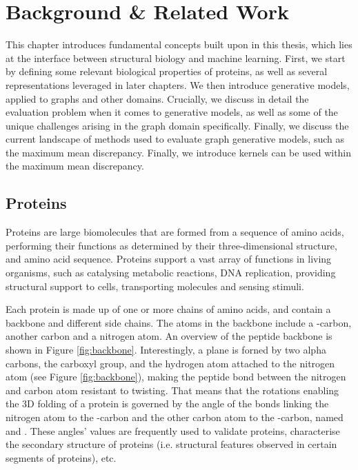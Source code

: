 
\chapter{Background \& Related Work}


This chapter introduces fundamental concepts built upon in this thesis, which
lies at the interface between structural biology and machine learning. First, we
start by defining some relevant biological properties of proteins, as well as
several representations leveraged in later chapters. We then introduce
generative models, applied to graphs and other domains. Crucially, we discuss in
detail the evaluation problem when it comes to generative models, as well as
some of the unique challenges arising in the graph domain specifically. Finally,
we discuss the current landscape of methods used to evaluate
graph generative models, such as the maximum mean discrepancy. Finally, we
introduce kernels can be used within the maximum mean discrepancy.

\section{Proteins}\label{sec:proteins}

Proteins are large biomolecules that are formed from a sequence of amino acids,
performing their functions as determined by their three-dimensional structure,
and amino acid sequence. Proteins support a vast array of functions in living
organisms, such as catalysing metabolic reactions, DNA replication, providing
structural support to cells, transporting molecules and sensing stimuli.

Each protein is made up of one or more chains of amino acids, and contain a
backbone and different side chains. The atoms in the backbone include a
\textalpha{}-carbon, another carbon and a nitrogen atom. An overview of the
peptide backbone is shown in Figure \ref{fig:backbone}. Interestingly, a plane
is forned by two alpha carbons, the carboxyl group, and the hydrogen atom
attached to the nitrogen atom (see Figure \ref{fig:backbone}), making the
peptide bond between the nitrogen and carbon atom resistant to twisting. That
means that the rotations enabling the 3D folding of a protein is governed by the
angle of the bonds linking the nitrogen atom to the \textalpha{}-carbon and the
other carbon atom to the \textalpha{}-carbon, named \textphi{} and \textpsi{}.
These angles' values are frequently used to validate proteins, characterise the
secondary structure of proteins (i.e. structural features observed in certain
segments of proteins), etc.


